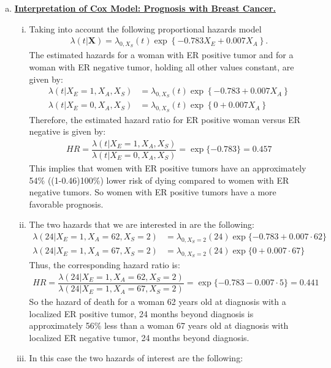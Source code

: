 \begin{enumerate}[(a)]
\item \textbf{\underline{Interpretation of Cox Model: Prognosis with Breast Cancer.}}
\begin{enumerate}[(i)]
\item Taking into account the following proportional hazards model
\begin{align}
\lambda(t|\mathbf{X})
 = \lambda_{0,X_{S}}(t)\exp\left\{-0.783X_{E}+0.007X_{A}\right\}.\nonumber
\end{align}
The estimated hazards for a woman with ER positive tumor and for a woman with ER
negative tumor, holding all other values constant, are given by:
\begin{align}
\lambda(t|X_{E}=1,X_{A},X_{S}) &= \lambda_{0,X_{S}}(t)\exp\left\{-0.783+0.007X_{A}\right\} \nonumber \\
\lambda(t|X_{E}=0,X_{A},X_{S}) &= \lambda_{0,X_{S}}(t)\exp\left\{0+0.007X_{A}\right\} 
\nonumber
\end{align}
Therefore, the estimated hazard ratio for ER positive woman versus ER negative is given by:
\begin{align}
HR = \dfrac{\lambda(t|X_{E}=1,X_{A},X_{S})}{\lambda(t|X_{E}=0,X_{A},X_{S})}
= \exp\{-0.783\} = 0.457 \nonumber 
\end{align}
This implies that women with ER positive tumors have an approximately 54\%
((1-0.46)100\%) lower risk of dying compared to women with ER negative tumors.
So women with ER positive tumors have a more favorable prognosis.
\item The two hazards that we are interested in are the following:
\begin{align}
\lambda(24|X_{E}=1,X_{A}=62,X_{S}=2) &= \lambda_{0,X_{S}=2}(24)
\exp\{-0.783+0.007\cdot62\} \nonumber \\
\lambda(24|X_{E}=1,X_{A}=67,X_{S}=2) &= \lambda_{0,X_{S}=2}(24)
\exp\{0+0.007\cdot67\} \nonumber 
\end{align}
Thus, the corresponding hazard ratio is:
\begin{align}
HR = \dfrac{\lambda(24|X_{E}=1,X_{A}=62,X_{S}=2)}{\lambda(24|X_{E}=1,X_{A}=67,X_{S}=2)}
= \exp\{-0.783-0.007\cdot5\} = 0.441\nonumber
\end{align}
So the hazard of death for a woman 62 years old at diagnosis with a localized ER
positive tumor, 24 months beyond diagnosis is approximately 56\% less than a woman
67 years old at diagnosis with localized ER negative tumor, 24 months beyond
diagnosis.
\item In this case the two hazards of interest are the following:

\end{enumerate}
\end{enumerate}
